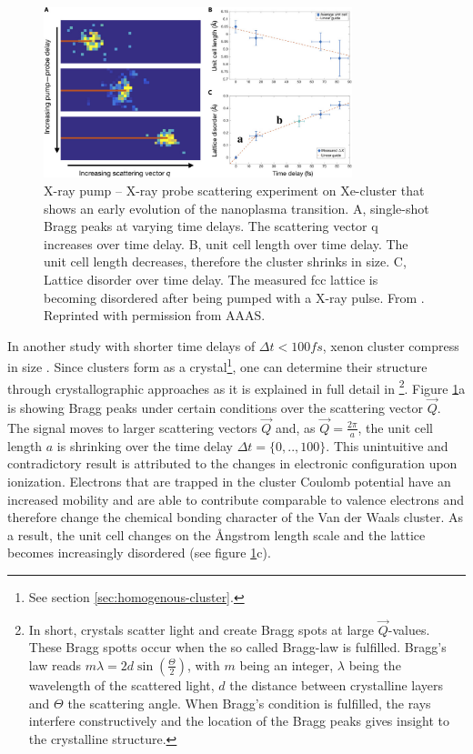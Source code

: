 \begin{figure}
	\centering
		\includegraphics[width=0.80\textwidth]{images/ken-science.jpg}
	\caption[Experiment that shows early evolution of the nanoplasma transition.]{X-ray pump -- X-ray probe scattering experiment on Xe-cluster that shows an early evolution of the nanoplasma transition. A, single-shot Bragg peaks at varying time delays. The scattering vector q increases over time delay. B, unit cell length over time delay. The unit cell length decreases, therefore the cluster shrinks in size. C, Lattice disorder over time delay. The measured fcc lattice is becoming disordered after being pumped with a X-ray pulse. From \citep{Ferguson-2016-SciAdv}. Reprinted with permission from AAAS.}
	\label{fig:ken-science}
\end{figure}
In another study with shorter time delays of $\Delta t<100 fs$, xenon cluster compress in size \citep{Ferguson-2016-SciAdv}. Since clusters form as a crystal\footnote{See section \ref{sec:homogenous-cluster}.}, one can determine their structure through crystallographic approaches as it is explained in full detail in \citep[][chapter 5]{Als-Nielson-2011-JWS}\footnote{In short, crystals scatter light and create Bragg spots at large $\vec{Q}$-values. These Bragg spotts occur when the so called Bragg-law is fulfilled. Bragg's law reads $m \lambda = 2d \sin\left(\frac{\Theta}{2}\right)$, with $m$ being an integer, $\lambda$ being the wavelength of the scattered light, $d$ the distance between crystalline layers and $\Theta$ the scattering angle. When Bragg's condition is fulfilled, the rays interfere constructively and the location of the Bragg peaks gives insight to the crystalline structure.}. Figure \ref{fig:ken-science}a is showing Bragg peaks under certain conditions over the scattering vector $\vec{Q}$. The signal moves to larger scattering vectors $\vec{Q}$ and, as $\vec{Q}=\frac{2\pi}{a}$, the unit cell length $a$ is shrinking over the time delay $\Delta t = \{0,..,100\}$. This unintuitive and contradictory result is attributed to the changes in electronic configuration upon ionization. Electrons that are trapped in the cluster Coulomb potential have an increased mobility and are able to contribute comparable to valence electrons and therefore change the chemical bonding character of the Van der Waals cluster. As a result, the unit cell changes on the {\AA}ngstrom length scale and the lattice becomes increasingly disordered (see figure \ref{fig:ken-science}c).\\
